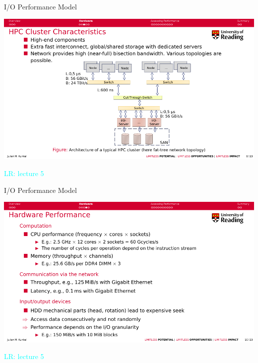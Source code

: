 \documentclass[compress,11pt,xcolor=svgnames,aspectratio=169]{beamer}
\newcommand{\lr}[1]{\textcolor{cyan}{LR: #1}}
\begin{document}
\begin{frame}[t]{I/O Performance Model}

\begin{center}
\includegraphics[scale=0.7]{fig/5-2}
\end{center}

\lr{lecture 5}

\end{frame}

\begin{frame}[t]{I/O Performance Model}

\begin{center}
\includegraphics[scale=0.7]{fig/5-3}
\end{center}

\lr{lecture 5}

\end{frame}
\end{document}
